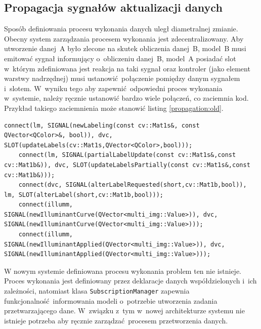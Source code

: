\subsection{Propagacja sygnałów aktualizacji danych}

Sposób definiowania procesu wykonania danych uległ diametralnej zmianie. Obecny system zarządzania procesem wykonania jest zdecentralizowany. Aby utworzenie danej~A było zlecone na skutek obliczenia danej~B, model~B musi emitować sygnał informujący o~obliczeniu danej~B, model~A posiadać slot w~którym zdefiniowana jest reakcja na taki sygnał oraz kontroler (jako element warstwy nadrzędnej) musi ustanowić połączenie pomiędzy danym sygnałem i~slotem. W~wyniku tego aby zapewnić odpowiedni proces wykonania w~systemie, należy ręcznie ustanowić bardzo wiele połączeń, co zaciemnia kod. Przykład takiego zaciemnienia może stanowić listing \ref{propagation:old}.

\begin{minipage}{\textwidth}
	\begin{lstlisting}[label=propagation:old, caption={Przykład definiowania procesu wykonania według starego systemu.},alsoletter={()[].=}]
	connect(lm, SIGNAL(newLabeling(const cv::Mat1s&, const QVector<QColor>&, bool)), dvc, SLOT(updateLabels(cv::Mat1s,QVector<QColor>,bool)));
	connect(lm, SIGNAL(partialLabelUpdate(const cv::Mat1s&,const cv::Mat1b&)), dvc, SLOT(updateLabelsPartially(const cv::Mat1s&,const cv::Mat1b&)));
	connect(dvc, SIGNAL(alterLabelRequested(short,cv::Mat1b,bool)), lm, SLOT(alterLabel(short,cv::Mat1b,bool)));
	connect(illumm, SIGNAL(newIlluminantCurve(QVector<multi_img::Value>)), dvc, SIGNAL(newIlluminantCurve(QVector<multi_img::Value>)));
	connect(illumm, SIGNAL(newIlluminantApplied(QVector<multi_img::Value>)), dvc, SIGNAL(newIlluminantApplied(QVector<multi_img::Value>)));
	\end{lstlisting}
\end{minipage}

W nowym systemie definiowana procesu wykonania problem ten nie istnieje. Proces wykonania jest definiowany przez deklaracje danych współdzielonych i~ich zależności, natomiast klasa \lstinline$SubscriptionManager$ zapewnia funkcjonalność informowania modeli o~potrzebie utworzenia zadania przetwarzającego dane. W~związku z~tym w~nowej architekturze systemu nie istnieje potrzeba aby ręcznie zarządzać procesem przetworzenia danych.

